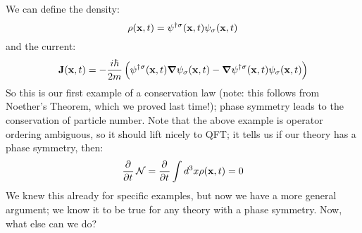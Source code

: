 We can define the density:
\begin{equation}
    \rho(\mathbf{x}, t) = \psi^{\dagger\sigma}(\mathbf{x}, t)\psi_\sigma(\mathbf{x}, t)
\end{equation}
and the current:
\begin{equation}
    \v{J}(\v{x}, t) = -\frac{i\hbar}{2m}\left(\psi^{\dag\sigma}(\v{x}, t)\nabla \psi_\sigma(\v{x}, t) - \nabla \psi^{\dag\sigma}(\v{x}, t)\psi_\sigma(\v{x}, t)\right)
\end{equation}
So this is our first example of a conservation law (note: this follows from Noether's Theorem, which we proved last time!); phase symmetry leads to the conservation of particle number. Note that the above example is operator ordering ambiguous, so it should lift nicely to QFT; it tells us if our theory has a phase symmetry, then:
\begin{equation}
    \dpd{}{t}\mathcal{N} = \dpd{}{t}\int d^3x \rho(\v{x}, t) = 0
\end{equation}
We knew this already for specific examples, but now we have a more general argument; we know it to be true for any theory with a phase symmetry. Now, what else can we do?

